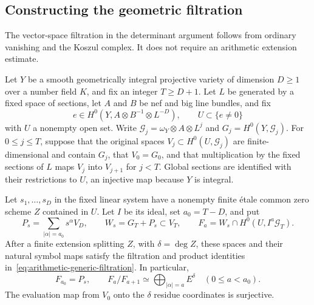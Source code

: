 \subsection{Constructing the geometric filtration}
\label{sec:geometric-section-filtration}

The vector-space filtration in the determinant argument follows from
ordinary vanishing and the Koszul complex.  It does not require an
arithmetic extension estimate.

Let $Y$ be a smooth geometrically integral projective variety of
dimension $D\geq1$ over a number field $K$, and fix an integer
$T\geq D+1$.  Let $L$ be generated by
a fixed space of sections, let $A$ and $B$ be nef and big line bundles,
and fix
\[
 e\in H^0(Y,A\otimes B^{-1}\otimes L^{-D}),\qquad
 U\subset\{e\ne0\}
\]
with $U$ a nonempty open set.  Write $\mathcal G_j=\omega_Y\otimes A\otimes L^j$
and $G_j=H^0(Y,\mathcal G_j)$.  For $0\leq j\leq T$, suppose that the original spaces
$V_j\subset H^0(U,\mathcal G_j)$ are finite-dimensional and contain
$G_j$, that $V_0=G_0$, and
that multiplication by the fixed sections of $L$ maps $V_j$ into
$V_{j+1}$ for $j<T$.  Global sections are identified with their restrictions to
$U$, an injective map because $Y$ is integral.

\begin{proposition}\label{prop:geometric-section-filtration}
Let $s_1,\ldots,s_D$ in the fixed linear system
have a nonempty finite \'etale common zero scheme $Z$ contained in $U$.
Let $I$ be its ideal, set $a_0=T-D$, and put
\[
 P_s=\sum_{|\alpha|=a_0}s^\alpha V_D,\qquad
 W_s=G_T+P_s\subset V_T,\qquad
 F_a=W_s\cap H^0(U,I^a\mathcal G_T).
\]
After a finite extension splitting $Z$, with $\delta=\deg Z$, these
spaces and their natural symbol maps satisfy the filtration and product
identities in~\eqref{eq:arithmetic-generic-filtration}.  In particular,
\[
             F_{a_0}=P_s,
 \qquad F_a/F_{a+1}\simeq
           \bigoplus_{|\alpha|=a}E^\delta\quad(0\leq a<a_0).
\]
The evaluation map from $V_0$ onto the $\delta$ residue coordinates is
surjective.
\end{proposition}

